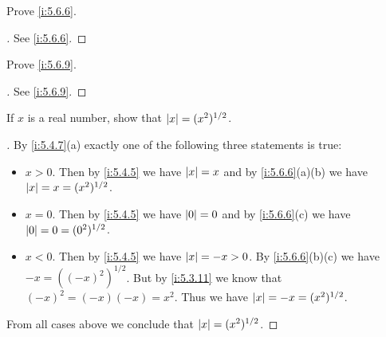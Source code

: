 \exercisesection

\begin{ex}\label{i:ex:5.6.1}
  Prove \cref{i:5.6.6}.
\end{ex}

\begin{proof}[]
  See \cref{i:5.6.6}.
\end{proof}

\begin{ex}\label{i:ex:5.6.2}
  Prove \cref{i:5.6.9}.
\end{ex}

\begin{proof}[]
  See \cref{i:5.6.9}.
\end{proof}

\begin{ex}\label{i:ex:5.6.3}
  If \(x\) is a real number, show that \(\left\lvert x\right\rvert = (x^2)^{1 / 2}\).
\end{ex}

\begin{proof}[]
  By \cref{i:5.4.7}(a) exactly one of the following three statements is true:
  \begin{itemize}
    \item \(x > 0\).
          Then by \cref{i:5.4.5} we have \(\left\lvert x\right\rvert = x\) and by \cref{i:5.6.6}(a)(b) we have \(\left\lvert x\right\rvert = x = (x^2)^{1 / 2}\).
    \item \(x = 0\).
          Then by \cref{i:5.4.5} we have \(\left\lvert0\right\rvert = 0\) and by \cref{i:5.6.6}(c) we have \(\left\lvert0\right\rvert = 0 = (0^2)^{1 / 2}\).
    \item \(x < 0\).
          Then by \cref{i:5.4.5} we have \(\left\lvert x\right\rvert = -x > 0\).
          By \cref{i:5.6.6}(b)(c) we have \(-x = ((-x)^2)^{1 / 2}\).
          But by \cref{i:5.3.11} we know that \((-x)^2 = (-x)(-x) = x^2\).
          Thus we have \(\left\lvert x\right\rvert = -x = (x^2)^{1 / 2}\).
  \end{itemize}
  From all cases above we conclude that \(\left\lvert x\right\rvert = (x^2)^{1 / 2}\).
\end{proof}
